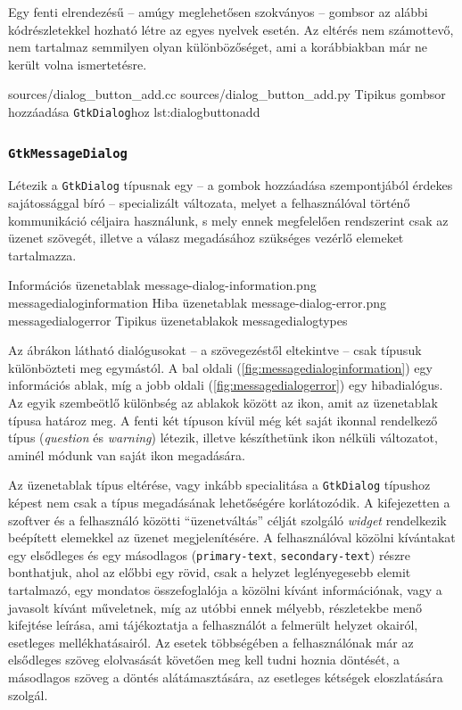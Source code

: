 Egy fenti elrendezésű -- amúgy meglehetősen szokványos -- gombsor az alábbi kódrészletekkel hozható létre az egyes nyelvek esetén. Az eltérés nem számottevő, nem tartalmaz semmilyen olyan különbözőséget, ami a korábbiakban már ne került volna ismertetésre.

{sources/dialog_button_add.cc}
{sources/dialog_button_add.py}
{Tipikus gombsor hozzáadása \texttt{GtkDialog}hoz}
{lst:dialogbuttonadd}

\subsubsection{\texttt{GtkMessageDialog}}
\label{sec:messagedialog}

Létezik a \texttt{GtkDialog} típusnak egy -- a gombok hozzáadása szempontjából érdekes sajátossággal bíró -- specializált változata, melyet a felhasználóval történő kommunikáció céljaira használunk, s mely ennek megfelelően rendszerint csak az üzenet szövegét, illetve a válasz megadásához szükséges vezérlő elemeket tartalmazza.

{Információs üzenetablak}
{message-dialog-information.png}
{messagedialoginformation}
{Hiba üzenetablak}
{message-dialog-error.png}
{messagedialogerror}
{Tipikus üzenetablakok}
{messagedialogtypes}

Az ábrákon látható dialógusokat -- a szövegezéstől eltekintve -- csak típusuk különbözteti meg egymástól. A bal oldali (\ref{fig:messagedialoginformation}) egy információs ablak, míg a jobb oldali (\ref{fig:messagedialogerror}) egy hibadialógus. Az egyik szembeötlő különbség az ablakok között az ikon, amit az üzenetablak típusa határoz meg. A fenti két típuson kívül még két saját ikonnal rendelkező típus (\textit{question} és \textit{warning}) létezik, illetve készíthetünk ikon nélküli változatot, aminél módunk van saját ikon megadására.

Az üzenetablak típus eltérése, vagy inkább specialitása a \texttt{GtkDialog} típushoz képest nem csak a típus megadásának lehetőségére korlátozódik. A kifejezetten a szoftver és a felhasználó közötti ``üzenetváltás'' célját szolgáló \textit{widget} rendelkezik beépített elemekkel az üzenet megjelenítésére. A felhasználóval közölni kívántakat egy elsődleges és egy másodlagos (\texttt{primary-text}, \texttt{secondary-text}) részre bonthatjuk, ahol az előbbi egy rövid, csak a helyzet leglényegesebb elemit tartalmazó, egy mondatos összefoglalója a közölni kívánt információnak, vagy a javasolt kívánt műveletnek, míg az utóbbi ennek mélyebb, részletekbe menő kifejtése leírása, ami tájékoztatja a felhasználót a felmerült helyzet okairól, esetleges mellékhatásairól. Az esetek többségében a felhasználónak már az elsődleges szöveg elolvasását követően meg kell tudni hoznia döntését, a másodlagos szöveg a döntés alátámasztására, az esetleges kétségek eloszlatására szolgál.

